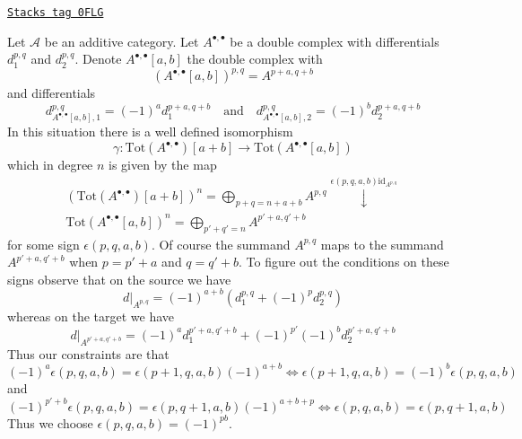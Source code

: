 \begin{remark}
\label{homology-remark-shift-double-complex}
\href{https://stacks.math.columbia.edu/tag/0FLG}{\texttt{Stacks tag 0FLG}}

Let $\mathcal{A}$ be an additive category. Let $A^{\bullet, \bullet}$
be a double complex with differentials $d_1^{p, q}$ and $d_2^{p, q}$.
Denote $A^{\bullet, \bullet}[a, b]$ the double complex with
$$
(A^{\bullet, \bullet}[a, b])^{p, q} = A^{p + a, q + b}
$$
and differentials
$$
d_{A^{\bullet, \bullet}[a, b], 1}^{p, q} = (-1)^a d_1^{p + a, q + b}
\quad\text{and}\quad
d_{A^{\bullet, \bullet}[a, b], 2}^{p, q} = (-1)^b d_2^{p + a, q + b}
$$
In this situation there is a well defined isomorphism
$$
\gamma :
\text{Tot}(A^{\bullet, \bullet})[a + b]
\longrightarrow
\text{Tot}(A^{\bullet, \bullet}[a, b])
$$
which in degree $n$ is given by the map
$$
\begin{array}{c}(\text{Tot}(A^{\bullet, \bullet})[a + b])^n =
\bigoplus_{p + q = n + a + b} A^{p, q}
\overset{\epsilon(p, q, a, b)\text{id}_{A^{p, q}}}{\downarrow} \\ \text{Tot}(A^{\bullet, \bullet}[a, b])^n =
\bigoplus_{p' + q' = n} A^{p' + a, q' + b}\end{array}
$$
for some sign $\epsilon(p, q, a, b)$. Of course the summand $A^{p, q}$
maps to the summand $A^{p' + a, q' + b}$ when $p = p' + a$ and $q = q' + b$.
To figure out the conditions on these signs observe that on the source we have
$$
d|_{A^{p, q}} = (-1)^{a + b}\left(d_1^{p, q} + (-1)^pd_2^{p, q}\right)
$$
whereas on the target we have
$$
d|_{A^{p' + a, q' + b}} =
(-1)^ad_1^{p' + a, q' + b} + (-1)^{p'}(-1)^bd_2^{p' + a, q' + b}
$$
Thus our constraints are that
$$
(-1)^a \epsilon(p, q, a, b) = \epsilon(p + 1, q, a, b)(-1)^{a + b}
\Leftrightarrow
\epsilon(p + 1, q, a, b) = (-1)^b \epsilon(p, q, a, b)
$$
and
$$
(-1)^{p' + b}\epsilon(p, q, a, b) =
\epsilon(p, q + 1, a, b) (-1)^{a + b + p}
\Leftrightarrow
\epsilon(p, q, a, b) = \epsilon(p, q + 1, a, b)
$$
Thus we choose $\epsilon(p, q, a, b) = (-1)^{pb}$.
\end{remark}

